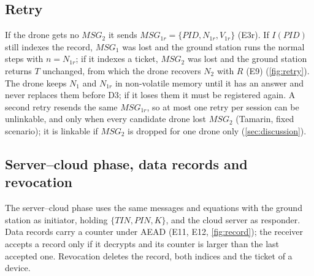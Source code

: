 \subsection{Retry}
If the drone gets no $MSG_2$ it sends $MSG_{1r} = \{PID, N_{1r}, V_{1r}\}$ (E3r). If $I(PID)$ still indexes the record,
$MSG_1$ was lost and the ground station runs the normal steps with $n = N_{1r}$; if it indexes a ticket, $MSG_2$ was lost and
the ground station returns $T$ unchanged, from which the drone recovers $N_2$ with $R$ (E9) (\cref{fig:retry}). The drone keeps
$N_1$ and $N_{1r}$ in non-volatile memory until it has an answer and never replaces them before D3; if it loses them it must be
registered again. A second retry resends the same $MSG_{1r}$, so at most one retry per session can be unlinkable, and only when
every candidate drone lost $MSG_2$ (Tamarin, fixed scenario); it is linkable if $MSG_2$ is dropped for one drone only
(\cref{sec:discussion}).


\subsection{Server--cloud phase, data records and revocation}
The server--cloud phase uses the same messages and equations with the ground station as initiator, holding $\{TIN, PIN, K\}$,
and the cloud server as responder. Data records carry a counter under AEAD (E11, E12, \cref{fig:record}); the receiver
accepts a record only if it decrypts and its counter is larger than the last accepted one. Revocation deletes the record, both
indices and the ticket of a device.

